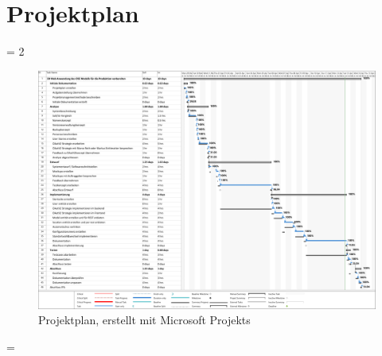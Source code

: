 \newpage
\section{Projektplan}
\pdfpagewidth= 2\paperwidth
\begin{addmargin}[0pt]{-\paperwidth}
    \begin{figure}[!h]
          \centering
        \includegraphics[height=0.85\textheight]{./projektplan/projektplan_ipa_a3.pdf}
        \caption[{Projektplan, erstellt mit Microsoft Projekts}]{Projektplan, erstellt mit Microsoft Projekts}
    \end{figure}
\end{addmargin}
\newpage
\pdfpagewidth= \paperwidth
